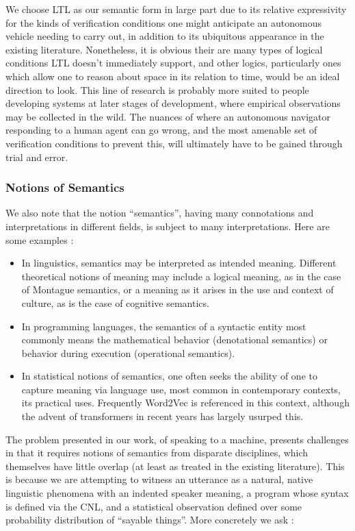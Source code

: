 \documentclass[a4paper, 11pt]{article}
\begin{document}
We choose LTL as our semantic form in large part due to its relative
expressivity for the kinds of verification conditions one might anticipate an
autonomous vehicle needing to carry out, in addition to its ubiquitous
appearance in the existing literature. Nonetheless, it is obvious their are many
types of logical conditions LTL doesn't immediately support, and other logics,
particularly ones which allow one to reason about space in its relation to time,
would be an ideal direction to look. This line of research is probably more
suited to people developing systems at later stages of development, where
empirical observations may be collected in the wild. The nuances of where an
autonomous navigator responding to a human agent can go wrong, and the most
amenable set of verification conditions to prevent this, will ultimately have to
be gained through trial and error.

\subsubsection{Notions of Semantics}

We also note that the notion ``semantics'', having many connotations and interpretations in
different fields, is subject to many interpretations. Here are some examples :

\begin{itemize}

\item In linguistics, semantics may be interpreted as intended meaning.
Different theoretical notions of meaning may include a logical meaning, as in
the case of Montague semantics, or a meaning as it arises in the use and context
of culture, as is the case of cognitive semantics.
\item In programming languages, the semantics of a syntactic entity most
commonly means the mathematical behavior (denotational semantics) or behavior
during execution (operational semantics).
\item In statistical notions of semantics, one often seeks the ability of one to
capture meaning via language use, most common in contemporary contexts, its
practical uses. Frequently Word2Vec \cite{word2vec} is referenced in this context,
although the advent of transformers in recent years has largely usurped this. 
\end{itemize}

The problem presented in our work, of speaking to a machine, presents challenges
in that it requires notions of semantics from disparate disciplines, which
themselves have little overlap (at least as treated in the existing literature).
This is because we are attempting to witness an utterance as a natural, native
linguistic phenomena with an indented speaker meaning, a program whose syntax is
defined via the CNL, and a statistical observation defined over some probability
distribution of ``sayable things''. More concretely we ask :
\end{document}
